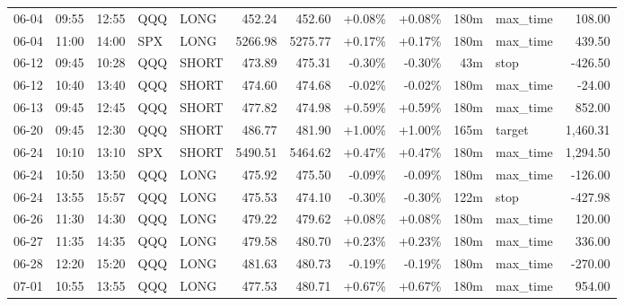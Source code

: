 \documentclass[11pt,a4paper,twoside]{article}
\begin{document}
\begin{center}
\begin{longtable}{>{\color{txtmain}}l l l l l r r r r r >{\color{txtmain}}l r}
06-04 & 09:55 & 12:55 & QQQ & LONG & 452.24 & 452.60 & \textcolor{wingreen}{+0.08\%} & \textcolor{wingreen}{+0.08\%} & 180m & max\_time & \textcolor{wingreen}{108.00} \\
06-04 & 11:00 & 14:00 & SPX & LONG & 5266.98 & 5275.77 & \textcolor{wingreen}{+0.17\%} & \textcolor{wingreen}{+0.17\%} & 180m & max\_time & \textcolor{wingreen}{439.50} \\
06-12 & 09:45 & 10:28 & QQQ & SHORT & 473.89 & 475.31 & \textcolor{lossred}{-0.30\%} & \textcolor{lossred}{-0.30\%} & 43m & stop & \textcolor{lossred}{-426.50} \\
06-12 & 10:40 & 13:40 & QQQ & SHORT & 474.60 & 474.68 & \textcolor{lossred}{-0.02\%} & \textcolor{lossred}{-0.02\%} & 180m & max\_time & \textcolor{lossred}{-24.00} \\
06-13 & 09:45 & 12:45 & QQQ & SHORT & 477.82 & 474.98 & \textcolor{wingreen}{+0.59\%} & \textcolor{wingreen}{+0.59\%} & 180m & max\_time & \textcolor{wingreen}{852.00} \\
06-20 & 09:45 & 12:30 & QQQ & SHORT & 486.77 & 481.90 & \textcolor{wingreen}{+1.00\%} & \textcolor{wingreen}{+1.00\%} & 165m & target & \textcolor{wingreen}{1,460.31} \\
06-24 & 10:10 & 13:10 & SPX & SHORT & 5490.51 & 5464.62 & \textcolor{wingreen}{+0.47\%} & \textcolor{wingreen}{+0.47\%} & 180m & max\_time & \textcolor{wingreen}{1,294.50} \\
06-24 & 10:50 & 13:50 & QQQ & LONG & 475.92 & 475.50 & \textcolor{lossred}{-0.09\%} & \textcolor{lossred}{-0.09\%} & 180m & max\_time & \textcolor{lossred}{-126.00} \\
06-24 & 13:55 & 15:57 & QQQ & LONG & 475.53 & 474.10 & \textcolor{lossred}{-0.30\%} & \textcolor{lossred}{-0.30\%} & 122m & stop & \textcolor{lossred}{-427.98} \\
06-26 & 11:30 & 14:30 & QQQ & LONG & 479.22 & 479.62 & \textcolor{wingreen}{+0.08\%} & \textcolor{wingreen}{+0.08\%} & 180m & max\_time & \textcolor{wingreen}{120.00} \\
06-27 & 11:35 & 14:35 & QQQ & LONG & 479.58 & 480.70 & \textcolor{wingreen}{+0.23\%} & \textcolor{wingreen}{+0.23\%} & 180m & max\_time & \textcolor{wingreen}{336.00} \\
06-28 & 12:20 & 15:20 & QQQ & LONG & 481.63 & 480.73 & \textcolor{lossred}{-0.19\%} & \textcolor{lossred}{-0.19\%} & 180m & max\_time & \textcolor{lossred}{-270.00} \\
07-01 & 10:55 & 13:55 & QQQ & LONG & 477.53 & 480.71 & \textcolor{wingreen}{+0.67\%} & \textcolor{wingreen}{+0.67\%} & 180m & max\_time & \textcolor{wingreen}{954.00} \\

\end{longtable}
\end{center}
\end{document}
